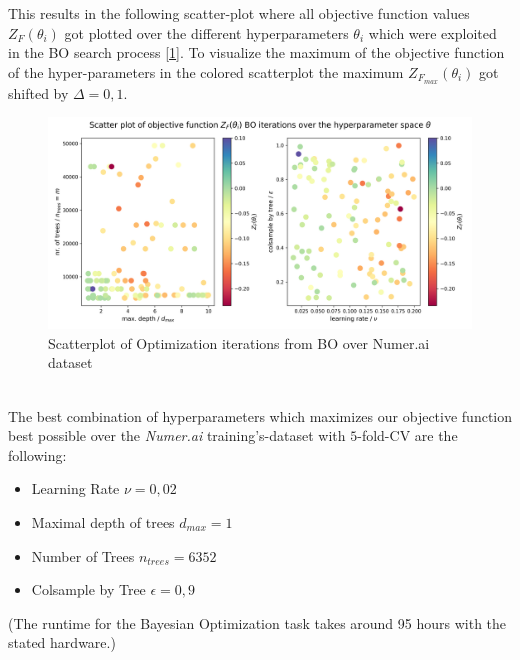 \documentclass[12pt, a4paper]{article}
\begin{document}
This results in the following scatter-plot where all objective function values $Z_F(\theta_i)$ got plotted over the different hyperparameters $\theta_i$ which were exploited in the BO search process [\ref{fig: bo_numerai_scatterplot}]. To visualize the maximum of the objective function of the hyper-parameters in the colored scatterplot the maximum $Z_{F_{max}}(\theta_i)$ got shifted by $\Delta = 0{,}1$.
\begin{figure}[!htpb]
    \centering
    \includegraphics[width=1\textwidth,trim={0 0 0 0},clip]{figures/bo_numerai_scatter_plot.png}
    \caption[Hyperparameter iterations from BO over Numer.ai dataset]{Scatterplot of Optimization iterations from BO over Numer.ai dataset}
    \label{fig: bo_numerai_scatterplot}
\end{figure}
\\
The best combination of hyperparameters which maximizes our objective function best possible over the \textit{Numer.ai} training's-dataset with $5$-fold-CV are the following:
\begin{itemize}
    \item Learning Rate $\nu = 0{,}02$
    \item Maximal depth of trees $d_{max} = 1$
    \item Number of Trees $n_{trees} = 6352$
    \item Colsample by Tree $\epsilon = 0{,}9$
\end{itemize}
(The runtime for the Bayesian Optimization task takes around 95 hours with the stated hardware.)
\newpage
\end{document}
